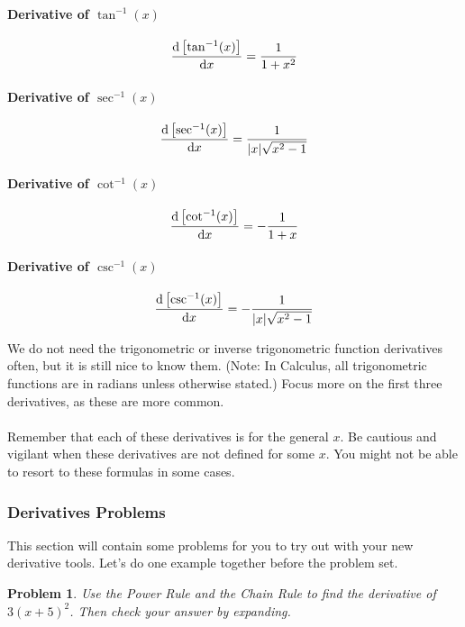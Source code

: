\documentclass{article}
\newtheorem*{problem}{Problem}
\begin{document}
\paragraph{Derivative of $\tan^{-1}(x)$}
\[\diff{\left[\tan^{-1}(x)\right]}{x}=\frac{1}{1+x^2}\]

\paragraph{Derivative of $\sec^{-1}(x)$}
\[\diff{\left[\sec^{-1}(x)\right]}{x}=\frac{1}{|x|\sqrt{x^2-1}}\]

\paragraph{Derivative of $\cot^{-1}(x)$}
\[\diff{\left[\cot^{-1}(x)\right]}{x}=-\frac{1}{1+x}\]

\paragraph{Derivative of $\csc^{-1}(x)$}
\[\diff{\left[\csc^{-1}(x)\right]}{x}=-\frac{1}{|x|\sqrt{x^2-1}}\]

\noindent We do not need the trigonometric or inverse trigonometric function derivatives often, but it is still nice to know them. (Note: In Calculus, all trigonometric functions are in radians unless otherwise stated.) Focus more on the first three derivatives, as these are more common. 
\\
\\
Remember that each of these derivatives is for the general $x$. Be cautious and vigilant when these derivatives are not defined for some $x$. You might not be able to resort to these formulas in some cases.

\subsubsection{Derivatives Problems}
This section will contain some problems for you to try out with your new derivative tools. Let's do one example together before the problem set. 
\begin{problem}
Use the Power Rule and the Chain Rule to find the derivative of $3(x+5)^2$. Then check your answer by expanding.
\end{problem}
\end{document}
